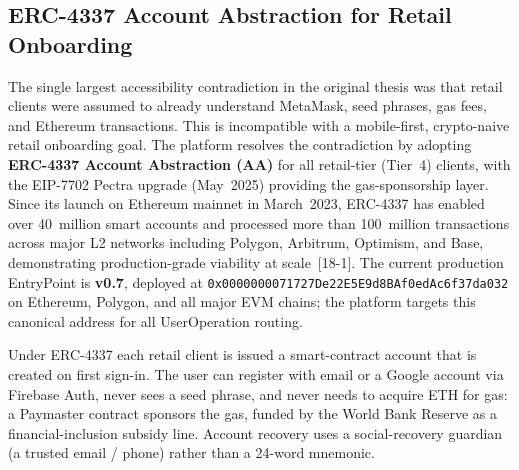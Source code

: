\documentclass[12pt,a4paper]{report}
\begin{document}
\subsection{ERC-4337 Account Abstraction for Retail Onboarding}
\label{sec:erc4337}

The single largest accessibility contradiction in the original thesis was that retail clients were assumed to already understand MetaMask, seed phrases, gas fees, and Ethereum transactions. This is incompatible with a mobile-first, crypto-naive retail onboarding goal. The platform resolves the contradiction by adopting \textbf{ERC-4337 Account Abstraction (AA)} for all retail-tier (Tier~4) clients, with the EIP-7702 Pectra upgrade (May~2025) providing the gas-sponsorship layer. Since its launch on Ethereum mainnet in March~2023, ERC-4337 has enabled over 40~million smart accounts and processed more than 100~million transactions across major L2 networks including Polygon, Arbitrum, Optimism, and Base, demonstrating production-grade viability at scale~[18-1]. The current production EntryPoint is \textbf{v0.7}, deployed at \texttt{0x0000000071727De22E5E9d8BAf0edAc6f37da032} on Ethereum, Polygon, and all major EVM chains; the platform targets this canonical address for all UserOperation routing.

Under ERC-4337 each retail client is issued a smart-contract account that is created on first sign-in. The user can register with email or a Google account via Firebase Auth, never sees a seed phrase, and never needs to acquire ETH for gas: a Paymaster contract sponsors the gas, funded by the World Bank Reserve as a financial-inclusion subsidy line. Account recovery uses a social-recovery guardian (a trusted email / phone) rather than a 24-word mnemonic.
\end{document}
